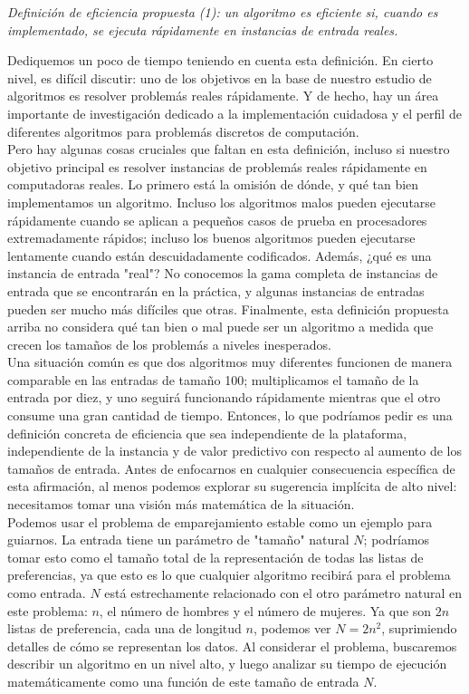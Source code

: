 \documentclass[a4paper]{article}
\begin{document}
\begin{center}\textit{Definición de eficiencia propuesta (1): un algoritmo es eficiente si, cuando es implementado, se ejecuta rápidamente en instancias de entrada reales.}\end{center}


 Dediquemos un poco de tiempo teniendo en cuenta esta definición. En cierto nivel, es difícil discutir: uno de los objetivos en la base de nuestro estudio de algoritmos es resolver problemás reales rápidamente. Y de hecho, hay un área importante de investigación dedicado a la implementación cuidadosa y el perfil de diferentes algoritmos para problemás discretos de computación.\\

 Pero hay algunas cosas cruciales que faltan en esta definición, incluso si nuestro objetivo principal es resolver instancias de problemás reales rápidamente en computadoras reales. Lo primero está la omisión de dónde, y qué tan bien implementamos un algoritmo.  Incluso los algoritmos malos pueden ejecutarse rápidamente cuando se aplican a pequeños casos de prueba en procesadores extremadamente  rápidos; incluso los buenos algoritmos pueden ejecutarse lentamente cuando están descuidadamente codificados. Además, ¿qué es una instancia de entrada "real"? No conocemos la gama completa de instancias de entrada que se encontrarán en la práctica, y algunas instancias de entradas pueden ser mucho más difíciles que otras. Finalmente, esta definición propuesta arriba no considera qué tan bien o mal puede ser un algoritmo a medida que crecen los tamaños de los problemás a niveles inesperados.\\
 
Una situación común es que dos algoritmos muy diferentes funcionen de manera comparable en las entradas de tamaño 100; multiplicamos el tamaño de la entrada por diez, y uno seguirá funcionando rápidamente mientras que el otro consume una gran cantidad de tiempo.  Entonces, lo que podríamos pedir es una definición concreta de eficiencia que sea independiente de la plataforma, independiente de la instancia y de valor predictivo con respecto al aumento de los tamaños de entrada. 
Antes de enfocarnos en cualquier consecuencia específica de esta afirmación, al menos podemos explorar su sugerencia implícita de alto nivel: necesitamos tomar una visión más matemática de la situación.\\

 Podemos usar el problema de emparejamiento estable como un ejemplo para guiarnos. La entrada tiene un parámetro de "tamaño" natural $N$; podríamos tomar esto como el tamaño total de la representación de todas las listas de preferencias, ya que esto es lo que cualquier algoritmo recibirá para el problema como entrada. $N$ está estrechamente relacionado con el otro parámetro natural en este problema: $n$, el número de hombres y el número de mujeres. Ya que son $2n$ listas de preferencia, cada una de longitud $n$, podemos ver $N = 2n^2$, suprimiendo detalles de cómo se representan los datos. 
Al considerar el problema, buscaremos describir un algoritmo en un nivel alto, y luego analizar su tiempo de ejecución matemáticamente como una función de este tamaño de entrada $N$. \\
\end{document}
